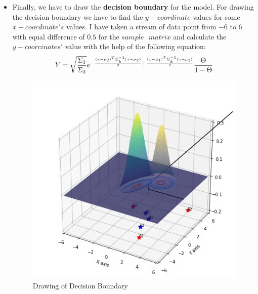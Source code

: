 \documentclass[conference]{IEEEtran}
\begin{document}
\begin{itemize}
\item Finally, we have to draw the \textbf{decision boundary} for the model. For drawing the decision boundary we have to find the $y-coordinate$ values for some $x-coordinate's$ values. I have taken a stream of data point from $-6$ to $6$ with equal difference of $0.5$ for the $sample\textrm{ }matrix$ and calculate the $y-coorcinates'$ value with the help of the following equation:\\ 
\begin{equation}
Y=\sqrt{\frac{\Sigma_1}{\Sigma_2}}e^{-\frac{(x-\mu_2)^T\Sigma_k^{-1}(x-\mu_2)}{2}+\frac{(x-\mu_1)^T\Sigma_k^{-1}(x-\mu_1)}{2}}\frac{\Theta}{1-\Theta}\\
\end{equation}
\begin{figure}[htb!]
\centerline{\includegraphics[scale=0.4673]{33.png}}
\caption{Drawing of Decision Boundary\\}
\label{fig}
\end{figure}
\\

\end{itemize}
\end{document}
